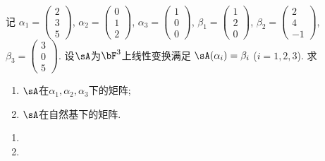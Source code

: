 \begin{frame}\frametitle{}

\begin{example}
记 $\alpha_1=\begin{pmatrix}2\\3\\5\end{pmatrix}$, $\alpha_2=\begin{pmatrix}0\\1\\2\end{pmatrix}$, $\alpha_3=\begin{pmatrix}1\\0\\0\end{pmatrix}$,
$\beta_1=\begin{pmatrix}1\\2\\0\end{pmatrix}$, $\beta_2=\begin{pmatrix}2\\4\\-1\end{pmatrix}$, $\beta_3=\begin{pmatrix}3\\0\\5\end{pmatrix}$.
\pp
设$\sA$为$\bF^3$上线性变换满足 $\sA(\alpha_i)=\beta_i$ ($i=1,2,3$).
\pp
求
\begin{enumerate}
\item $\sA$在$\alpha_1,\alpha_2,\alpha_3$下的矩阵;
\item $\sA$在自然基下的矩阵.
\end{enumerate}
\end{example}
\pp
{}
\begin{enumerate}
\item {}
\item {}
\end{enumerate}

\end{frame}









